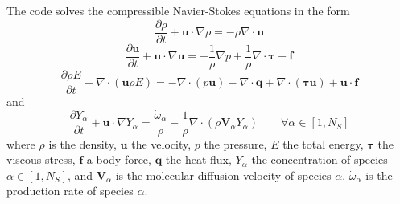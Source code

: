 \documentclass[notitlepage]{revtex4-1}
\begin{document}
The code solves the compressible Navier-Stokes equations in the form
\begin{equation}\frac{\partial\rho}{\partial{t}}+\bm{u}\cdot\nabla\rho=-\rho\nabla\cdot\bm{u}\label{eq:mass}\end{equation}
\begin{equation}\frac{\partial\bm{u}}{\partial{t}}+\bm{u}\cdot\nabla\bm{u}=-\frac{1}{\rho}\nabla{p}+\frac{1}{\rho}\nabla\cdot\bm{\tau}+\bm{f}\label{eq:mom}\end{equation}
\begin{equation}\frac{\partial\rho{E}}{\partial{t}}+\nabla\cdot\left(\bm{u}\rho{E}\right)=-\nabla\cdot\left(p\bm{u}\right)-\nabla\cdot\bm{q}+\nabla\cdot\left(\bm{\tau}\bm{u}\right)+\bm{u}\cdot\bm{f}\label{eq:en}\end{equation}
and
\begin{equation}\frac{\partial{Y}_{\alpha}}{\partial{t}}+\bm{u}\cdot\nabla{Y}_{\alpha}=\frac{\dot\omega_{\alpha}}{\rho}-\frac{1}{\rho}\nabla\cdot\left(\rho\bm{V}_{\alpha}Y_{\alpha}\right)\qquad\forall\alpha\in\left[1,N_{S}\right]\label{eq:Y}\end{equation}
where $\rho$ is the density, $\bm{u}$ the velocity, $p$ the pressure, $E$ the total energy, $\bm{\tau}$ the viscous stress, $\bm{f}$ a body force, $\bm{q}$ the heat flux, $Y_{\alpha}$ the concentration of species $\alpha\in\left[1,N_{S}\right]$, and $\bm{V}_{\alpha}$ is the molecular diffusion velocity of species $\alpha$. $\dot\omega_{\alpha}$ is the production rate of species $\alpha$.
\end{document}
